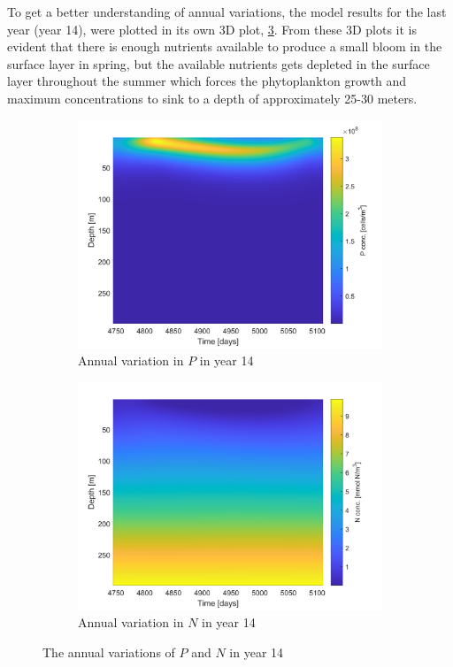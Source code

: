 To get a better understanding of annual variations, the model results for the last year (year 14), were plotted in its own 3D plot, \cref{fig:Y14Var}. From these 3D plots it is evident that there is enough nutrients available to produce a small bloom in the surface layer in spring, but the available nutrients gets depleted in the surface layer throughout the summer which forces the phytoplankton growth and maximum concentrations to sink to a depth of approximately 25-30 meters.    

\begin{figure}[h!]
\centering
\begin{subfigure}{.5\textwidth}
  \centering
  \includegraphics[width=\linewidth]{Pictures/Year14P.png}
  \caption{Annual variation in $P$ in year 14}
  \label{fig:Y14P}
\end{subfigure}%
\begin{subfigure}{.5\textwidth}
  \centering
  \includegraphics[width=\linewidth]{Pictures/Year14N.png}
  \caption{Annual variation in $N$ in year 14}
  \label{fig:Y14N}
\end{subfigure}
\caption{The annual variations of $P$ and $N$ in year 14}
\label{fig:Y14Var}
\end{figure}

